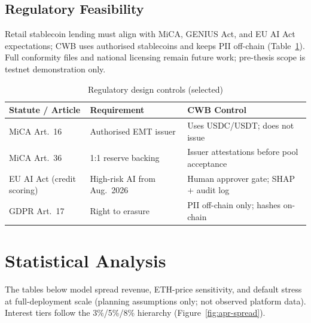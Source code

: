 \documentclass[12pt, a4paper]{report}
\newcommand{\tableheadcolor}{\rowcolor{TableHeadBg}}
\begin{document}
\vspace{2pt}

\subsection{Regulatory Feasibility}
\label{sec:mica-compliance}

Retail stablecoin lending must align with MiCA, GENIUS Act, and EU AI Act expectations; CWB uses authorised stablecoins and keeps PII off-chain (Table~\ref{tab:mica-mapping}). Full conformity files and national licensing remain future work; pre-thesis scope is testnet demonstration only.

\begin{table}[H]
\centering
\caption[Regulatory design controls (selected)]{Regulatory design controls (selected)}
\label{tab:mica-mapping}
\begin{tabular}{p{3.2cm}p{4.6cm}p{5.8cm}}
\toprule
\tableheadcolor
\textbf{Statute / Article} & \textbf{Requirement} & \textbf{CWB Control} \\
\midrule
MiCA Art.~16 & Authorised EMT issuer & Uses USDC/USDT; does not issue \\
MiCA Art.~36 & 1{:}1 reserve backing & Issuer attestations before pool acceptance \\
EU AI Act (credit scoring) & High-risk AI from Aug.~2026~ & Human approver gate; SHAP + audit log \\
GDPR Art.~17 & Right to erasure & PII off-chain only; hashes on-chain \\
\bottomrule
\end{tabular}
\end{table}

\section{Statistical Analysis}
\label{sec:statistical-analysis}
\label{sec:interest-rates}

The tables below model spread revenue, ETH-price sensitivity, and default stress at full-deployment scale (planning assumptions only; not observed platform data). Interest tiers follow the 3\%/5\%/8\% hierarchy (Figure~\ref{fig:apr-spread}).
\end{document}
